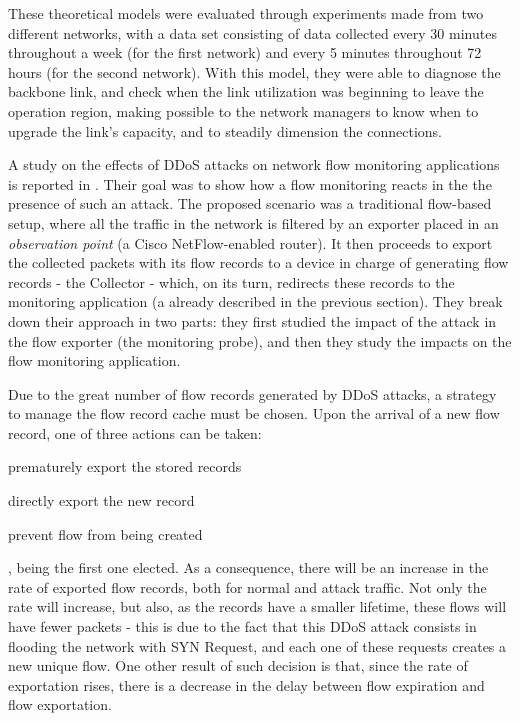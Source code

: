 \documentclass[runningheads,a4paper]{llncs}
\begin{document}
These theoretical models were evaluated through experiments made from two different networks, with a data set consisting of data collected every 30 minutes throughout a week (for the first network) and every 5 minutes throughout 72 hours (for the second network). With this model, they were able to diagnose the backbone link, and check when the link utilization was beginning to leave the operation region, making possible to the network managers to know when to upgrade the link's capacity, and to steadily dimension the connections.  



A study on the effects of DDoS attacks on network flow monitoring applications is reported in \cite{Sadre2012}. Their goal was to show how a flow monitoring reacts in the the presence of such an attack. The proposed scenario was a traditional flow-based setup, where all the traffic in the network is filtered by an exporter placed in an \textit{observation point} (a Cisco NetFlow-enabled router). It then proceeds to export the collected packets with its flow records to a device in charge of generating flow records - the Collector - which, on its turn, redirects these records to the monitoring application (a already described in the previous section). They break down their approach in two parts: they first studied the impact of the attack in the flow exporter (the monitoring probe), and then they study the impacts on the flow monitoring application.

Due to the great number of flow records generated by DDoS attacks, a strategy to manage the flow record cache must be chosen. Upon the arrival of a new flow record, one of three actions can be taken: 
\begin{enumerate*}
  \item prematurely export the stored records
  \item directly export the new record
  \item prevent flow from being created
\end{enumerate*}, being the first one elected. As a consequence, there will be an increase in the rate of exported flow records, both for normal and attack traffic. Not only the rate will increase, but also, as the records have a smaller lifetime, these flows will have fewer packets - this is due to the fact that this DDoS attack consists in flooding the network with SYN Request, and each one of these requests creates a new unique flow. One other result of such decision is that, since the rate of exportation rises, there is a decrease in the delay between flow expiration and flow exportation.
\end{document}
